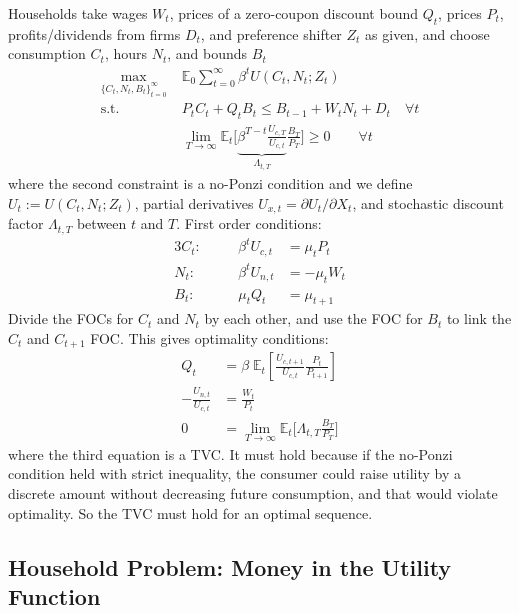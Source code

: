 \documentclass[12pt]{article}
\theoremstyle{plain}
\theoremstyle{definition}
\theoremstyle{remark}
\newcommand{\limT}{\lim_{T\rightarrow\infty}}
\newcommand{\E}{\mathbb{E}}
\newcommand{\sumtinfz}{\sum^\infty_{t=0}}
\newcommand{\tinfz}{^\infty_{t=0}}
\begin{document}
Households take wages $W_t$, prices of a zero-coupon discount bound
$Q_t$, prices $P_t$, profits/dividends from firms $D_t$, and preference
shifter $Z_t$ as given, and choose consumption $C_t$, hours $N_t$, and
bounds $B_t$
\begin{align*}
  \max_{\{C_t,N_t,B_t\}\tinfz} \;
  &\E_0\sumtinfz \beta^t U(C_t,N_t;Z_t) \\
  \text{s.t.}\quad&
  P_tC_t + Q_{t}B_t \leq B_{t-1} + W_tN_t + D_t\quad \forall t\\
  &\limT \E_t\bigg[
    \underbrace{\beta^{T-t} \frac{U_{c,T}}{U_{c,t}}}_{\Lambda_{t,T}}
    \frac{B_T}{P_T}
  \bigg]
  \geq 0
  \qquad \forall t
\end{align*}
where the second constraint is a no-Ponzi condition and
we define $U_t:=U(C_t,N_t;Z_t)$, partial derivatives
$U_{x,t}=\partial U_t/\partial X_t$, and stochastic discount factor
$\Lambda_{t,T}$ between $t$ and $T$.
First order conditions:
\begin{alignat*}{3}
  C_t:&&\quad
  \beta^t U_{c,t} &= \mu_t P_t
  \\
  N_t:&&\quad
  \beta^t U_{n,t} &= -\mu_t W_t
  \\
  B_t:&&\quad
  \mu_t Q_t &= \mu_{t+1}
\end{alignat*}
Divide the FOCs for $C_t$ and $N_t$ by each other, and use the FOC for
$B_t$ to link the $C_t$ and $C_{t+1}$ FOC. This gives optimality
conditions:
\begin{align*}
  Q_t &=
  \beta\;
  \E_t\left[
    \frac{U_{c,t+1}}{U_{c,t}}
    \frac{P_t}{P_{t+1}}
  \right]
  \\
  -\frac{U_{n,t}}{U_{c,t}}
  &=
  \frac{W_t}{P_{t}} \\
  0 &=
  \limT \E_t\bigg[
    \Lambda_{t,T}
    \frac{B_T}{P_T}
  \bigg]
\end{align*}
where the third equation is a TVC. It must hold because if the no-Ponzi
condition held with strict inequality, the consumer could raise
utility by a discrete amount without decreasing future consumption, and
that would violate optimality. So the TVC must hold for an optimal
sequence.

\clearpage
\subsection{Household Problem: Money in the Utility Function}
\end{document}
